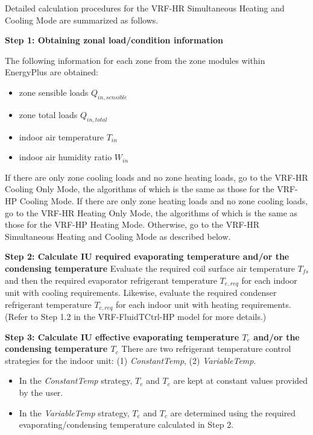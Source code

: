 Detailed calculation procedures for the VRF-HR Simultaneous Heating and Cooling Mode are summarized as follows.

\textbf{Step 1: Obtaining zonal load/condition information}

The following information for each zone from the zone modules within EnergyPlus are obtained:

\begin{itemize}
  \item
    zone sensible loads $Q_{in, sensible}$
  \item
    zone total loads $Q_{in, total}$
  \item
    indoor air temperature $T_{in}$
  \item
    indoor air humidity ratio $W_{in}$
\end{itemize}

If there are only zone cooling loads and no zone heating loads, go to the VRF-HR Cooling Only Mode, the algorithms of which is the same as those for the VRF-HP Cooling Mode. If there are only zone heating loads and no zone cooling loads, go to the VRF-HR Heating Only Mode, the algorithms of which is the same as those for the VRF-HP Heating Mode. Otherwise, go to the VRF-HR Simultaneous Heating and Cooling Mode as described below.

\textbf{Step 2: Calculate IU required evaporating temperature and/or the condensing temperature}
Evaluate the required coil surface air temperature $T_{fs}$ and then the required evaporator refrigerant temperature $T_{e,req}$ for each indoor unit with cooling requirements. Likewise, evaluate the required condenser refrigerant temperature ${T_{c,req}}$ for each indoor unit with heating requirements.
(Refer to Step 1.2 in the VRF-FluidTCtrl-HP model for more details.)

\textbf{Step 3: Calculate IU effective evaporating temperature $T_e$ and/or the condensing temperature $T_c$}
There are two refrigerant temperature control strategies for the indoor unit: (1) \emph{ConstantTemp}, (2) \emph{VariableTemp}.

\begin{itemize}
  \item
    In the \emph{ConstantTemp} strategy, $T_e$ and $T_c$ are kept at constant values provided by the user.
  \item
    In the \emph{VariableTemp} strategy, $T_e$ and $T_c$ are determined using the required evaporating/condensing temperature calculated in Step 2.
\end{itemize}


